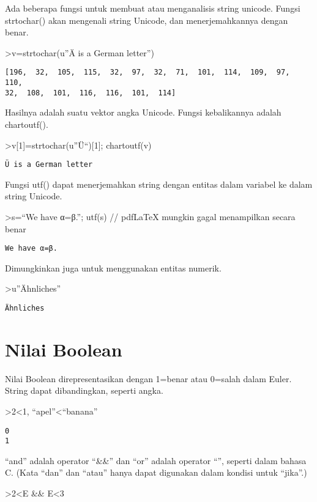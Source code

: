 \documentclass[
]{book}
\begin{document}
Ada beberapa fungsi untuk membuat atau menganalisis string unicode. Fungsi strtochar() akan mengenali string Unicode, dan menerjemahkannya dengan benar.

\textgreater v=strtochar(u''Ä is a German letter'')

\begin{verbatim}
[196,  32,  105,  115,  32,  97,  32,  71,  101,  114,  109,  97,  110,
32,  108,  101,  116,  116,  101,  114]
\end{verbatim}

Hasilnya adalah suatu vektor angka Unicode. Fungsi kebalikannya adalah chartoutf().

\textgreater v{[}1{]}=strtochar(u''Ü``){[}1{]}; chartoutf(v)

\begin{verbatim}
Ü is a German letter
\end{verbatim}

Fungsi utf() dapat menerjemahkan string dengan entitas dalam variabel ke dalam string Unicode.

\textgreater s=``We have α=β.''; utf(s) // pdfLaTeX mungkin gagal menampilkan secara benar

\begin{verbatim}
We have α=β.
\end{verbatim}

Dimungkinkan juga untuk menggunakan entitas numerik.

\textgreater u''Ähnliches''

\begin{verbatim}
Ähnliches
\end{verbatim}

\section{Nilai Boolean}\label{nilai-boolean}

Nilai Boolean direpresentasikan dengan 1=benar atau 0=salah dalam Euler. String dapat dibandingkan, seperti angka.

\textgreater2\textless1, ``apel''\textless{}``banana''

\begin{verbatim}
0
1
\end{verbatim}

``and'' adalah operator ``\&\&'' dan ``or'' adalah operator ``\textbar\textbar{}'', seperti dalam bahasa C. (Kata ``dan'' dan ``atau'' hanya dapat digunakan dalam kondisi untuk ``jika''.)

\textgreater2\textless E \&\& E\textless3
\end{document}
